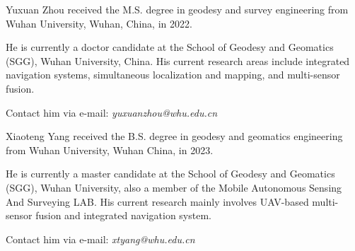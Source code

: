 \documentclass[lettersize,journal,twoside]{IEEEtran}
\begin{document}
\begin{IEEEbiography}{Yuxuan Zhou}
	received the M.S. degree in geodesy and survey engineering from Wuhan University, Wuhan, China, in 2022.
	
	He is currently a doctor candidate at the School of Geodesy and Geomatics (SGG), Wuhan University, China. His current research areas include integrated navigation systems, simultaneous localization and	mapping, and multi-sensor fusion.
	
	Contact him via	e-mail: \emph{yuxuanzhou@whu.edu.cn}
\end{IEEEbiography}
\begin{IEEEbiography}{Xiaoteng Yang}
    received the B.S. degree in geodesy and geomatics engineering from Wuhan University, Wuhan China, in 2023.
    
    He is currently a master candidate at the School of Geodesy and Geomatics (SGG), Wuhan University, also a member of the Mobile Autonomous Sensing And Surveying LAB. His current research mainly involves UAV-based multi-sensor fusion and integrated navigation system.
    
    Contact him via    e-mail: \emph{xtyang@whu.edu.cn}
\end{IEEEbiography}
\end{document}
